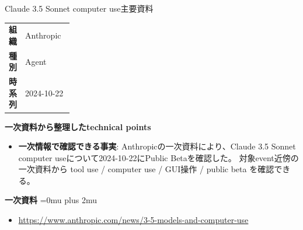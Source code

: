 \begin{technicalnote}{Claude 3.5 Sonnet computer use}{主要資料}
\begingroup
\begin{tabularx}{\linewidth}{@{}>{\bfseries}p{0.22\linewidth}X@{}}
組織 & Anthropic \\
種別 & Agent \\
時系列 & 2024-10-22 \\
\end{tabularx}
\smallskip
{\bfseries 一次資料から整理したtechnical points}
\begin{itemize}[leftmargin=1.5em,itemsep=0.35em]
\item \textbf{一次情報で確認できる事実}: Anthropicの一次資料により、Claude 3.5 Sonnet computer useについて2024-10-22にPublic Betaを確認した。 対象event近傍の一次資料から tool use / computer use / GUI操作 / public beta を確認できる。
\end{itemize}
\begin{minipage}{\linewidth}
\begin{samepage}
{\bfseries 一次資料}
\begingroup\sloppy
\Urlmuskip=0mu plus 2mu\relax
\begin{itemize}[leftmargin=1.5em,itemsep=0.25em]
\item {\scriptsize\url{https://www.anthropic.com/news/3-5-models-and-computer-use}}
\end{itemize}
\endgroup
\end{samepage}
\end{minipage}
\endgroup
\end{technicalnote}
\medskip

